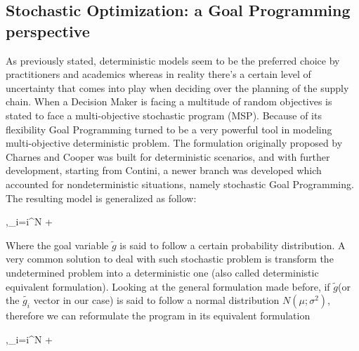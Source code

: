 \begin{doublespace}
  \subsection{Stochastic Optimization: a Goal Programming perspective}
 As previously stated, deterministic models seem to be the preferred choice by practitioners and academics whereas in reality there's a certain level of uncertainty that comes into play when deciding over the planning of the supply chain. When a Decision Maker is facing a multitude of random objectives is stated to face a multi-objective stochastic program (MSP). Because of its flexibility Goal Programming turned to be a very powerful tool in modeling multi-objective deterministic problem. The formulation originally proposed by Charnes and Cooper\cite{Charnes1955} was built for deterministic scenarios, and with further development, starting from Contini\cite{Contini1968}, a newer branch was developed which accounted for nondeterministic situations, namely stochastic Goal Programming. The resulting model is generalized as follow:
\begin{mini!}
	{\tilde{\delta^+},\tilde{\delta^-}}{\sum_{i=i}^{N} +}{}{}
\end{mini!}
Where the goal variable $\tilde{g}$ is said to follow a certain probability distribution. A very common solution to deal with such stochastic problem is transform the undetermined problem into a deterministic one (also called deterministic equivalent formulation). Looking at the general formulation made before, if $\tilde{g}$(or the $\tilde{g_i}$ vector in our case) is said to follow a normal distribution $N(\mu;\sigma^2)$, therefore we can reformulate the program in its equivalent formulation\cite{Azimian2017}
\begin{mini!}
	{\tilde{\delta^+},\tilde{\delta^-}}{\sum_{i=i}^{N} +}{}{}
\end{mini!}


\end{doublespace}
